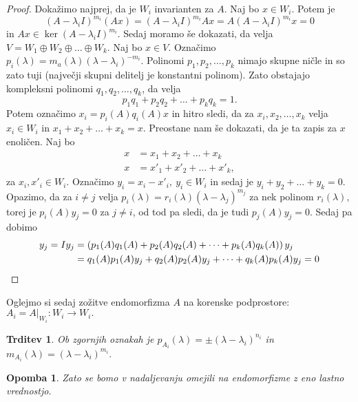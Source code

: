 \documentclass[10pt, a4paper]{article}
\newtheorem{trditev}[izr]{Trditev}
\newtheorem*{opomba}{Opomba}
\newenvironment{noticeC}{%
  \tcolorbox[%
  notitle,
  empty,
  enhanced,  %
  breakable,
  coltext=black, 
  fontupper=\rmfamily,
  parbox=false,
  noparskip,
  sharp corners,
  boxrule=-1pt,  %
  frame hidden,
  left=7pt,  %
  right=7pt,
  top=5pt,
  bottom=5pt,
  before skip=2.5ex plus 2pt,
  after skip=2.5ex plus 2pt,
  overlay unbroken and last={%
  },
  ]}
{\endtcolorbox}
\newenvironment{dokaz}%
  {\begin{noticeC}\begin{proof}}%
  {\end{proof}\end{noticeC}}
\begin{document}
\begin{dokaz}
    Dokažimo najprej, da je $W_i$ invarianten za $A$.
    Naj bo $x \in W_i$. Potem je 
    $$(A - \lambda_i I)^{m_i} (Ax) = (A - \lambda_i I)^{m_i} Ax = A (A - \lambda_i I)^{m_i} x = 0$$
    in $A x \in \ker (A - \lambda_i I)^{m_i}$.
    Sedaj moramo še dokazati, da velja $V = W_1 \oplus W_2 \oplus \dots \oplus W_k.$
    Naj bo $x \in V$. Označimo $p_i (\lambda) = m_a (\lambda) (\lambda - \lambda_i)^{-m_i}.$
    Polinomi $p_1, p_2, \dots, p_k$ nimajo skupne ničle in so zato tuji (največji skupni delitelj je konstantni polinom).
    Zato obstajajo kompleksni polinomi $q_1, q_2, \dots, q_k$, da velja $$p_1 q_1 + p_2 q_2 + \dots + p_k q_k = 1.$$
    Potem označimo $x_i = p_i (A) q_i (A) x$ in hitro sledi, 
    da za $x_i, x_2, \dots, x_k$ velja $x_i \in W_i$ in $x_1 + x_2 + \dots + x_k = x.$  
    Preostane nam še dokazati, da je ta zapis za $x$ enoličen. Naj bo 
    \begin{align*}
        x &= x_1 + x_2 + \dots + x_k\\
        x &= x'_1 + x'_2 + \dots + x'_k,
    \end{align*}
    za $x_i, x'_i \in W_i$. Označimo $y_i = x_i - x'_i,\ y_i \in W_i$ in sedaj je 
    $y_i + y_2 + \dots + y_k = 0.$
    Opazimo, da za $i \neq j$ velja $p_i (\lambda) = r_i (\lambda) (\lambda - \lambda_j)^{m_j}$ za nek polinom $r_i (\lambda),$
    torej je $p_i (A) y_j = 0$ za $j \neq i$, od tod pa sledi, da je tudi $p_j (A) y_j = 0.$
    Sedaj pa dobimo 
    \begin{align*}
        y_j = I y_j &= \left( p_1 (A) q_1 (A) + p_2 (A) q_2 (A) + \dots + p_k (A) q_k (A) \right) y_j\\
        &= q_1 (A) p_1 (A) y_j + q_2 (A) p_2 (A) y_j + \dots + q_k (A) p_k (A) y_j
        = 0 \qedhere
    \end{align*}
\end{dokaz}

Oglejmo si sedaj zožitve endomorfizma $A$ na korenske podprostore: $A_i = A\big|_{W_i} : W_i \rightarrow W_i.$

\begin{trditev}
    Ob zgornjih oznakah je $p_{A_i} (\lambda) = \pm (\lambda - \lambda_i)^{n_i}$ in $m_{A_i} (\lambda) = (\lambda - \lambda_i)^{m_i}.$
\end{trditev}

\begin{opomba}
    Zato se bomo v nadaljevanju omejili na endomorfizme z eno lastno vrednostjo.
\end{opomba}
\end{document}
